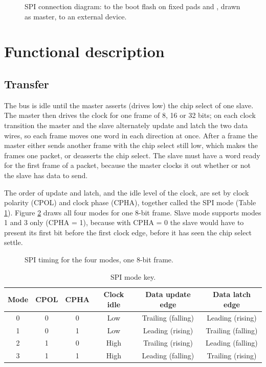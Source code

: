 \begin{figure}[htbp]
	\centering
	
	\caption{SPI connection diagram:  to the boot flash on fixed pads and , drawn as master, to an external device.}
	\label{fig:spi-connection-diagram}
\end{figure}

\section{Functional description}

\subsection{Transfer}

The bus is idle until the master asserts (drives low) the chip select of one slave. The master then drives the clock for one frame of 8, 16 or 32 bits; on each clock transition the master and the slave alternately update and latch the two data wires, so each frame moves one word in each direction at once. After a frame the master either sends another frame with the chip select still low, which makes the frames one packet, or deasserts the chip select. The slave must have a word ready for the first frame of a packet, because the master clocks it out whether or not the slave has data to send.

The order of update and latch, and the idle level of the clock, are set by clock polarity (CPOL) and clock phase (CPHA), together called the SPI mode (Table \ref{t:SPIMODE-key}). Figure \ref{fig:spi-timing-diagram} draws all four modes for one 8-bit frame. Slave mode supports modes 1 and 3 only (CPHA = 1), because with CPHA = 0 the slave would have to present its first bit before the first clock edge, before it has seen the chip select settle.

\begin{figure}[htpb]
	
	\caption{SPI timing for the four modes, one 8-bit frame.}
	\label{fig:spi-timing-diagram}
\end{figure}

\begin{table}[htb]
	\centering
	\caption{SPI mode key.}
	\label{t:SPIMODE-key}
	\begin{tabular}{ c c c c c c }
	\textbf{Mode} & \textbf{CPOL} & \textbf{CPHA} & \textbf{Clock idle} & \textbf{Data update edge} & \textbf{Data latch edge} \\ \hline
	0 & 0 & 0 & Low & Trailing (falling) & Leading (rising) \\
	\rowcolor{tablehighlightcolor}
	1 & 0 & 1 & Low & Leading (rising) & Trailing (falling) \\
	2 & 1 & 0 & High & Trailing (rising) & Leading (falling) \\
	\rowcolor{tablehighlightcolor}
	3 & 1 & 1 & High & Leading (falling) & Trailing (rising) \\
	\hline
	\end{tabular}
\end{table}

